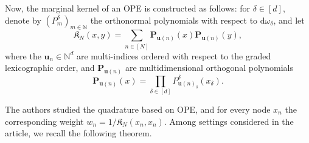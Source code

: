 \documentclass[twoside,11pt]{book}
\numberwithin{theorem}{chapter}
\numberwithin{definition}{chapter}
\numberwithin{proposition}{chapter}
\numberwithin{corollary}{chapter}
\numberwithin{example}{chapter}
\numberwithin{lemma}{chapter}
\begin{document}
Now, the  marginal kernel of an OPE is constructed as follows: for $\delta \in [d]$, denote by 
$(P^{\delta}_{m})_{m \in \mathbb{N}}$ the orthonormal polynomials with respect to $\mathrm{d}\omega_{\delta}$, and let
\begin{equation}
\mathfrak{K}_{N}(x,y) = \sum\limits_{n \in [N]} \bm{P}_{\bm{u}(n)}(x)\bm{P}_{\bm{u}(n)}(y),
\end{equation}
where the $\bm{u}_{n} \in \mathbb{N}^{d}$ are multi-indices ordered with respect to the graded lexicographic order, and $\bm{P}_{\bm{u}(n)}$ are multidimensional orthogonal polynomials
\begin{equation}
\bm{P}_{\bm{u}(n)}(x) = \prod\limits_{\delta \in [d]} P^{\delta}_{\bm{u}(n)_{\delta}}(x_{\delta}).
\end{equation}


The authors studied the quadrature based on OPE, and for every node $x_{n}$ the corresponding weight $\displaystyle w_{n} =1/\mathfrak{K}_{N}(x_{n},x_{n})$. Among settings considered in the article, we recall the following theorem.

\end{document}

